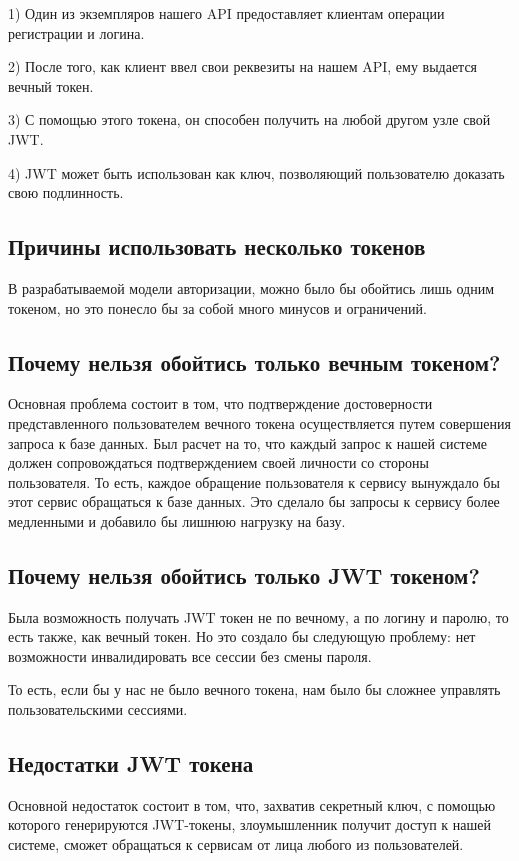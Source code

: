 \documentclass[14pt]{extarticle}
\begin{document}
    1) Один из экземпляров нашего API предоставляет клиентам операции регистрации и логина.

    2) После того, как клиент ввел свои реквезиты на нашем API, ему выдается вечный токен.

    3) С помощью этого токена, он способен получить на любой другом узле свой JWT.

    4) JWT может быть использован как ключ, позволяющий пользователю доказать свою подлинность.

    \subsection{Причины использовать несколько токенов}

    В разрабатываемой модели авторизации, можно было бы обойтись лишь одним токеном, но это
    понесло бы за
    собой много минусов и ограничений.

    \subsection{Почему нельзя обойтись только вечным токеном?}

    Основная проблема состоит в том, что подтверждение достоверности представленного пользователем вечного токена
    осуществляется путем совершения запроса к базе данных. Был расчет на то, что каждый запрос к нашей системе
    должен сопровождаться подтверждением своей личности со стороны пользователя. То есть, каждое обращение
    пользователя к сервису вынуждало бы этот сервис обращаться к базе данных. Это сделало бы запросы к сервису более
    медленными и добавило бы лишнюю нагрузку на базу.

    \subsection{Почему нельзя обойтись только JWT токеном?}

    Была возможность получать JWT токен не по вечному, а по логину и паролю, то есть также, как вечный токен. Но это
    создало бы следующую проблему: нет возможности инвалидировать все сессии без смены пароля.

    То есть, если бы у нас не было вечного токена, нам было бы сложнее управлять пользовательскими сессиями.

    \subsection{Недостатки JWT токена}
    Основной недостаток состоит в том, что, захватив секретный ключ, с помощью которого генерируются JWT-токены,
    злоумышленник получит доступ к нашей системе, сможет обращаться к сервисам от лица любого из пользователей.
\end{document}

